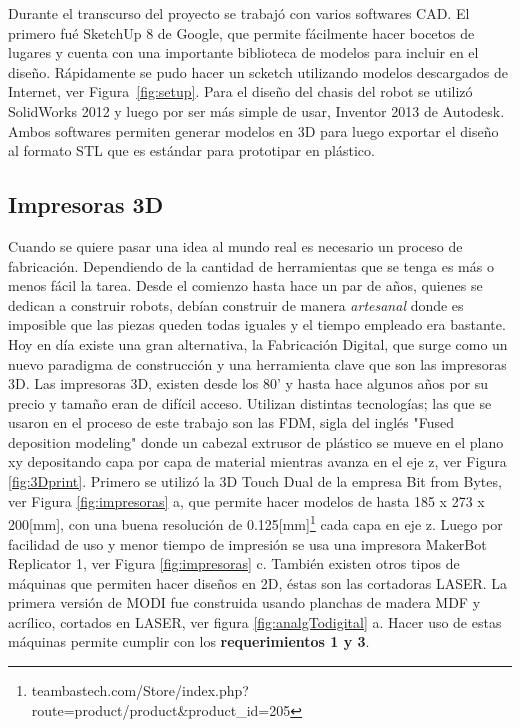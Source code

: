 Durante el transcurso del proyecto se trabajó con varios softwares CAD. El primero fué SketchUp 8 de Google, que permite fácilmente hacer bocetos de lugares y cuenta con una importante biblioteca de modelos para incluir en el diseño. Rápidamente se pudo hacer un scketch utilizando modelos descargados de Internet, ver Figura~\ref{fig:setup}. Para el diseño del chasis del robot se utilizó SolidWorks 2012 y luego por ser más simple de usar, Inventor 2013 de Autodesk. Ambos softwares permiten generar modelos en 3D para luego exportar el diseño al formato STL que es estándar para prototipar en plástico. 




\subsection{Impresoras 3D}
Cuando se quiere pasar una idea al mundo real es necesario un proceso de fabricación. Dependiendo de la cantidad de herramientas que se tenga es más o menos fácil la tarea. Desde el comienzo hasta hace un par de años, quienes se dedican a construir robots, debían construir de manera \textit{artesanal} donde es imposible que las piezas queden todas iguales y el tiempo empleado era bastante. Hoy en día existe una gran alternativa, la Fabricación Digital, que surge como un nuevo paradigma de construcción y una herramienta clave que son las impresoras 3D. Las impresoras 3D, existen desde los 80' y hasta hace algunos años por su precio y tamaño eran de difícil acceso. Utilizan distintas tecnologías; las que se usaron en el proceso de este trabajo son las FDM, sigla del inglés "Fused deposition modeling" donde un cabezal extrusor de plástico se mueve en el plano xy depositando capa por capa de material mientras avanza en el eje z, ver Figura \ref{fig:3Dprint}. Primero se utilizó la 3D Touch Dual de la empresa Bit from Bytes, ver Figura \ref{fig:impresoras} a, que permite hacer modelos de hasta 185 x 273 x 200[mm], con una buena resolución de 0.125[mm]\footnote{teambastech.com/Store/index.php?route=product/product\&product\_id=205} cada capa en eje z. Luego por facilidad de uso y menor tiempo de impresión se usa una impresora MakerBot Replicator 1, ver Figura \ref{fig:impresoras} c. También existen otros tipos de máquinas que permiten hacer diseños en 2D, éstas son las cortadoras LASER. La primera versión de MODI fue construida usando planchas de madera MDF y acrílico, cortados en LASER, ver figura \ref{fig:analgTodigital} a. Hacer uso de estas máquinas permite cumplir con los \textbf{requerimientos 1 y 3}.

